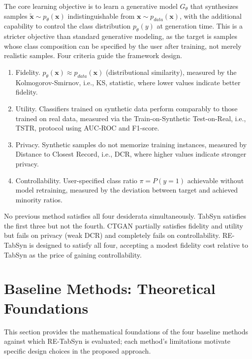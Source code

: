 The core learning objective is to learn a generative model $G_\theta$ that synthesizes samples $\tilde{\mathbf{x}} \sim p_\theta(\mathbf{x})$ indistinguishable from $\mathbf{x} \sim p_{data}(\mathbf{x})$, with the additional capability to control the class distribution $p_\theta(y)$ at generation time. This is a stricter objective than standard generative modeling, as the target is samples whose class composition can be specified by the user after training, not merely realistic samples. Four criteria guide the framework design.
\begin{enumerate}
    \item Fidelity. $p_\theta(\mathbf{x}) \approx p_{data}(\mathbf{x})$ (distributional similarity), measured by the Kolmogorov-Smirnov, i.e., KS, statistic, where lower values indicate better fidelity.

    \item Utility. Classifiers trained on synthetic data perform comparably to those trained on real data, measured via the Train-on-Synthetic Test-on-Real, i.e., TSTR, protocol using AUC-ROC and F1-score.

    \item Privacy. Synthetic samples do not memorize training instances, measured by Distance to Closest Record, i.e., DCR, where higher values indicate stronger privacy.

    \item Controllability. User-specified class ratio $\pi = P(y=1)$ achievable without model retraining, measured by the deviation between target and achieved minority ratios.
\end{enumerate}

No previous method satisfies all four desiderata simultaneously. TabSyn satisfies the first three but not the fourth. CTGAN partially satisfies fidelity and utility but fails on privacy (weak DCR) and completely fails on controllability. RE-TabSyn is designed to satisfy all four, accepting a modest fidelity cost relative to TabSyn as the price of gaining controllability.

\section{Baseline Methods: Theoretical Foundations}

This section provides the mathematical foundations of the four baseline methods against which RE-TabSyn is evaluated; each method's limitations motivate specific design choices in the proposed approach.

